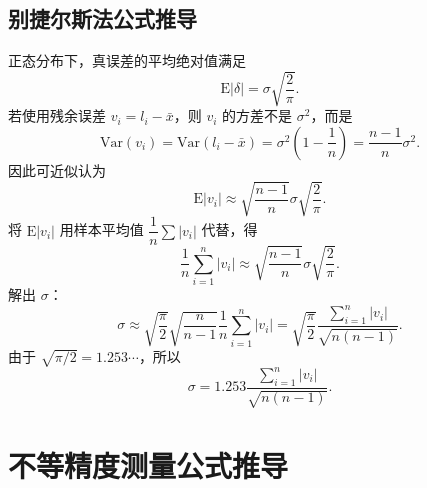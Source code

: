 \documentclass[UTF8,12pt,a4paper]{ctexart}
\newcommand{\E}{\mathrm{E}}
\newcommand{\Var}{\mathrm{Var}}
\newcommand{\abs}[1]{\left|#1\right|}
\begin{document}
\newpage

\subsection{别捷尔斯法公式推导}
正态分布下，真误差的平均绝对值满足
\begin{equation*}
    \E\abs{\delta}=\sigma\sqrt{\frac{2}{\pi}} .
\end{equation*}
若使用残余误差 $v_i=l_i-\bar{x}$，则 $v_i$ 的方差不是 $\sigma^2$，而是
\begin{equation*}
    \Var(v_i)=\Var(l_i-\bar{x})=\sigma^2\left(1-\frac{1}{n}\right)=\frac{n-1}{n}\sigma^2 .
\end{equation*}
因此可近似认为
\begin{equation*}
    \E\abs{v_i}\approx \sqrt{\frac{n-1}{n}}\sigma\sqrt{\frac{2}{\pi}} .
\end{equation*}
将 $\E\abs{v_i}$ 用样本平均值 $\dfrac{1}{n}\sum\abs{v_i}$ 代替，得
\begin{equation*}
    \frac{1}{n}\sum_{i=1}^{n}\abs{v_i}
    \approx \sqrt{\frac{n-1}{n}}\sigma\sqrt{\frac{2}{\pi}} .
\end{equation*}
解出 $\sigma$：
\begin{equation*}
    \sigma\approx\sqrt{\frac{\pi}{2}}\sqrt{\frac{n}{n-1}}\frac{1}{n}\sum_{i=1}^{n}\abs{v_i}=\sqrt{\frac{\pi}{2}}\frac{\sum_{i=1}^{n}\abs{v_i}}{\sqrt{n(n-1)}}.
\end{equation*}
由于 $\sqrt{\pi/2}=1.253\cdots$，所以
\begin{equation*}
    \sigma=1.253\frac{\sum_{i=1}^{n}\abs{v_i}}{\sqrt{n(n-1)}} .
\end{equation*}

\section{不等精度测量公式推导}
\end{document}
